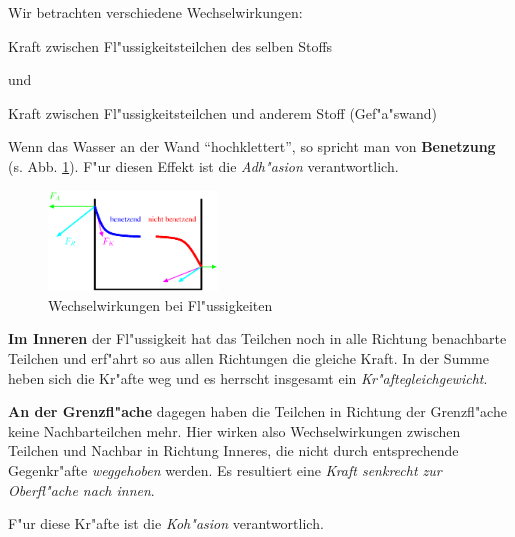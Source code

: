 Wir betrachten verschiedene Wechselwirkungen:

\begin{Def}
Kraft zwischen
     Fl"ussigkeitsteilchen des selben Stoffs
\end{Def}
und 
\begin{Def}
Kraft zwischen Fl"ussigkeitsteilchen und anderem Stoff (Gef"a"swand)
\end{Def}
\begin{description}[\setlabelstyle{\bfseries\slshape}]
\item[Gef"a"swand--Fl"ussigkeit]   Wenn  das Wasser an der Wand "`hochklettert"', so spricht man
   von \textbf{Benetzung} (s. Abb. \ref{abb_benetzen}). F"ur diesen
    Effekt ist die \emph{Adh"asion} verantwortlich.

   \begin{figure}
      \centering
      \includegraphics[width=0.4\textwidth]{bilder/benetzen}
      \caption{Wechselwirkungen bei Fl"ussigkeiten}
      \label{abb_benetzen}
   \end{figure}


\item[Fl"ussigkeit--Gas] \textbf{Im Inneren} der Fl"ussigkeit hat das Teilchen
   noch in alle Richtung benachbarte Teilchen und erf"ahrt so aus allen
   Richtungen die gleiche Kraft. In der Summe heben sich die Kr"afte
   weg und es herrscht insgesamt ein \emph{Kr"aftegleichgewicht}.

   \textbf{An der Grenzfl"ache} dagegen haben die Teilchen in Richtung
   der Grenzfl"ache keine Nachbarteilchen mehr. Hier wirken also
   Wechselwirkungen zwischen Teilchen und Nachbar in Richtung Inneres,
   die nicht durch entsprechende Gegenkr"afte \emph{weggehoben}
   werden. Es resultiert eine \emph{Kraft senkrecht zur Oberfl"ache
     nach innen}.

F"ur diese Kr"afte ist die \emph{Koh"asion} verantwortlich.
\end{description} 



